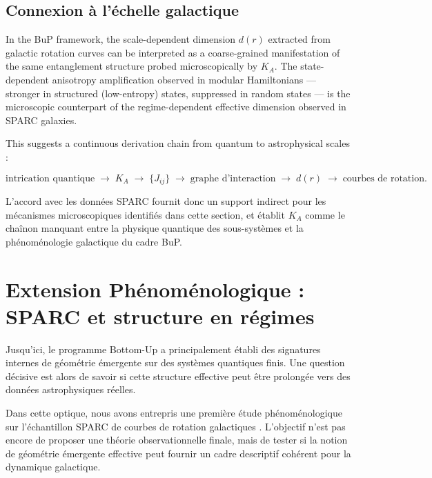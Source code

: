\documentclass[11pt]{article}
\begin{document}
\subsection{Connexion à l'échelle galactique}

In the BuP framework, the scale-dependent dimension $d(r)$ extracted from galactic rotation curves can be interpreted as a coarse-grained manifestation of the same entanglement structure probed microscopically by $K_A$. The state-dependent anisotropy amplification observed in modular Hamiltonians --- stronger in structured (low-entropy) states, suppressed in random states --- is the microscopic counterpart of the regime-dependent effective dimension observed in SPARC galaxies.

This suggests a continuous derivation chain from quantum to astrophysical scales :

\[
\text{intrication quantique}
\;\rightarrow\; K_A \;\rightarrow\; \{J_{ij}\}
\;\rightarrow\; \text{graphe d'interaction}
\;\rightarrow\; d(r)
\;\rightarrow\; \text{courbes de rotation.}
\]

L'accord avec les données SPARC fournit donc un support indirect pour les mécanismes microscopiques identifiés dans cette section, et établit $K_A$ comme le chaînon manquant entre la physique quantique des sous-systèmes et la phénoménologie galactique du cadre BuP.


\section{Extension Phénoménologique : SPARC et structure en régimes}

Jusqu'ici, le programme Bottom-Up a principalement établi des signatures internes de géométrie émergente sur des systèmes quantiques finis. Une question décisive est alors de savoir si cette structure effective peut être prolongée vers des données astrophysiques réelles.

Dans cette optique, nous avons entrepris une première étude phénoménologique sur l'échantillon SPARC de courbes de rotation galactiques \cite{sparc}. L'objectif n'est pas encore de proposer une théorie observationnelle finale, mais de tester si la notion de géométrie émergente effective peut fournir un cadre descriptif cohérent pour la dynamique galactique.
\end{document}

